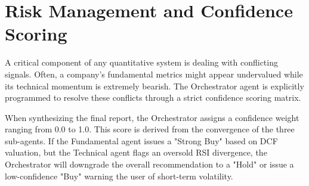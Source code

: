 \section{Risk Management and Confidence Scoring}

A critical component of any quantitative system is dealing with conflicting signals. Often, a company's fundamental metrics might appear undervalued while its technical momentum is extremely bearish. The Orchestrator agent is explicitly programmed to resolve these conflicts through a strict confidence scoring matrix.

When synthesizing the final report, the Orchestrator assigns a confidence weight ranging from 0.0 to 1.0. This score is derived from the convergence of the three sub-agents. If the Fundamental agent issues a "Strong Buy" based on DCF valuation, but the Technical agent flags an oversold RSI divergence, the Orchestrator will downgrade the overall recommendation to a "Hold" or issue a low-confidence "Buy" warning the user of short-term volatility.
